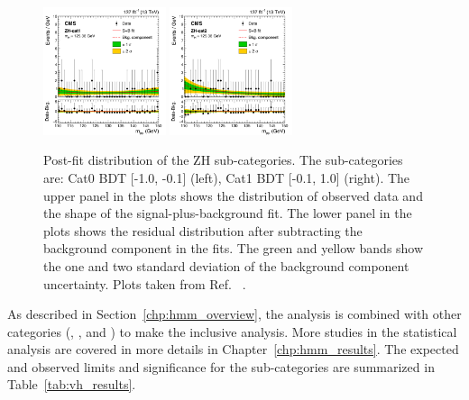 \begin{figure}[!htb]
  \centering
  \captionsetup{justification=justified}
  \includegraphics[width=0.32\textwidth]{pics/VH_sec/VH_results/postfit_ZH_cat1.png}
  \includegraphics[width=0.32\textwidth]{pics/VH_sec/VH_results/postfit_ZH_cat2.png}
  \caption{Post-fit \mmm distribution of the ZH sub-categories. The sub-categories are: Cat0 BDT [-1.0, -0.1] (left), Cat1 BDT [-0.1, 1.0] (right). 
           The upper panel in the plots shows the distribution of observed data and the shape of the signal-plus-background fit.
           The lower panel in the plots shows the residual distribution after subtracting the background component in the fits.
           The green and yellow bands show the one and two standard deviation of the background component uncertainty.
           Plots taken from Ref. ~\cite{cmscollaboration2020evidence}.}
  \label{fig:zh_postfit}
\end{figure}

As described in Section~\ref{chp:hmm_overview}, 
the \VH analysis is combined with other categories (\ggH, \qqH, and \ttH) to make the inclusive \hmm analysis.
More studies in the statistical analysis are covered in more details in Chapter~\ref{chp:hmm_results}.
The expected and observed limits and significance for the \VH sub-categories are summarized in Table~\ref{tab:vh_results}.

